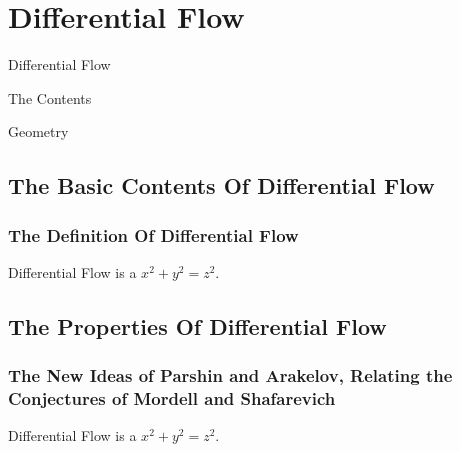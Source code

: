 \chapter{Differential Flow}
\begin{introduction}
\item Differential Flow
\item The Contents
\item Geometry
\end{introduction}
\section{The Basic Contents Of Differential Flow}
\subsection{The Definition Of Differential Flow}
\begin{definition}
Differential Flow is a $x^2+y^2=z^2$.\cite{example-book,example-article,example-website}
\end{definition}
\section{The Properties Of Differential Flow}
\subsection{The New Ideas of Parshin and Arakelov, Relating
the Conjectures of Mordell and Shafarevich}
\begin{theorem}
Differential Flow is a $x^2+y^2=z^2$.\cite{example-book,example-article,example-website}
\end{theorem}